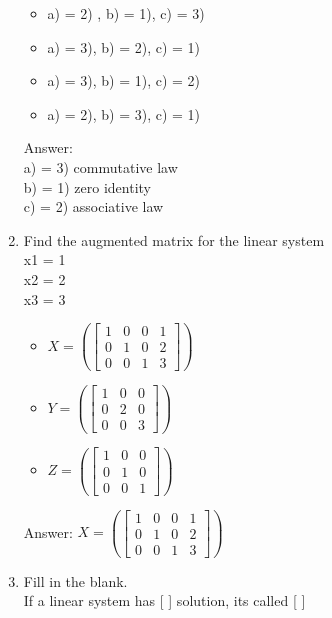 \documentclass{article}
\begin{document}
\begin{enumerate}
        \begin{itemize}
            \item a) = 2) , b) = 1), c) = 3)
            \item a) = 3), b) = 2), c) = 1)
            \item a) = 3), b) = 1), c) = 2)
            \item a) = 2), b) = 3), c) = 1)
        \end{itemize}    
        
        Answer: \\
        a) = 3) commutative law \\
        b) = 1) zero identity \\
        c) = 2) associative law 
    
    \item Find the augmented matrix for the linear system\\
        x1 = 1 \\
        x2 = 2 \\
        x3 = 3
        
        \begin{itemize}
            \item $X = \left( \begin{bmatrix} 1& 0& 0&1 \\ 0& 1& 0&2\\ 0& 0& 1&3 \end{bmatrix}\right)$
            \item $Y = \left( \begin{bmatrix} 1& 0& 0 \\ 0& 2& 0\\ 0& 0& 3 \end{bmatrix}\right)$
            \item $Z = \left( \begin{bmatrix} 1& 0& 0 \\ 0& 1& 0\\ 0& 0& 1 \end{bmatrix}\right)$
        \end{itemize}    
        
        Answer: $X = \left( \begin{bmatrix} 1& 0& 0&1 \\ 0& 1& 0&2\\ 0& 0& 1&3 \end{bmatrix}\right)$
    
    \item Fill in the blank. \\
    If a linear system has [  ] solution, its called [ ]


\end{enumerate}
\end{document}
